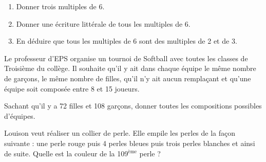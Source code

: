 
\begin{enumerate}
\item Donner trois multiples de 6.
\item Donner une écriture littérale de tous les multiples de 6.
\item En déduire que tous les multiples de 6 sont des multiples de 2 et de 3.
\end{enumerate}




Le professeur d'EPS organise un tournoi de Softball avec toutes les classes de Troisième du collège. Il souhaite qu'il y ait dans chaque équipe le même nombre de garçons, le même nombre de filles, qu'il n'y ait aucun remplaçant et qu'une équipe soit composée entre 8 et 15 joueurs.

Sachant qu'il y a 72 filles et 108 garçons, donner toutes les compositions possibles d'équipes.



Louison veut réaliser un collier de perle. Elle empile les perles de la façon suivante : une perle rouge puis 4 perles bleues puis trois perles blanches et ainsi de suite. Quelle est la couleur de la 109$^\text{ème}$ perle ?



 

 

 
 